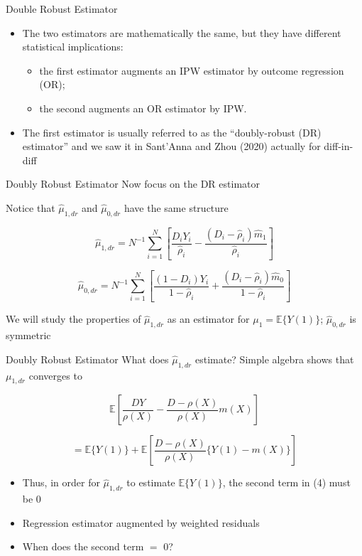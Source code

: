 \documentclass{beamer}
\begin{document}
\begin{frame}{Double Robust Estimator}

\begin{itemize}

\item     The two estimators are mathematically the same, but they have different statistical implications:
    	\begin{itemize}
	\item  the first estimator augments an IPW estimator by outcome regression (OR); 
	\item the second augments an OR estimator by IPW.
	\end{itemize}
\item The first estimator is usually referred to as the ``doubly-robust (DR) estimator'' and we saw it in Sant'Anna and Zhou (2020) actually for diff-in-diff

\end{itemize}
\end{frame}


\begin{frame}{Doubly Robust Estimator}
    Now focus on the DR estimator

    Notice that \( \hat{\mu}_{1,dr} \) and \( \hat{\mu}_{0,dr} \) have the same structure

    \[
    \hat{\mu}_{1,dr} = N^{-1} \sum_{i=1}^{N} \left[ \frac{D_iY_i}{\hat{\rho}_i} - \frac{(D_i - \hat{\rho}_i)\hat{m}_1}{\hat{\rho}_i} \right]
    \]

    \[
    \hat{\mu}_{0,dr} = N^{-1} \sum_{i=1}^{N} \left[ \frac{(1 - D_i)Y_i}{1 - \hat{\rho}_i} + \frac{(D_i - \hat{\rho}_i)\hat{m}_0}{1 - \hat{\rho}_i} \right]
    \]

    We will study the properties of \( \hat{\mu}_{1,dr} \) as an estimator for \( \mu_1 = \mathbb{E}\{Y(1)\} \); \( \hat{\mu}_{0,dr} \) is symmetric
\end{frame}




\begin{frame}{Doubly Robust Estimator}
    What does \( \hat{\mu}_{1,dr} \) estimate? Simple algebra shows that \( \mu_{1, dr} \) converges to

    \[
    \mathbb{E}\left[ \frac{DY}{\rho(X)} - \frac{D - \rho(X)}{\rho(X)}m(X) \right]
    \]

    \[
    = \mathbb{E}\{Y(1)\} + \mathbb{E}\left[ \frac{D - \rho(X)}{\rho(X)}\{Y(1) - m(X)\} \right]
    \]


\begin{itemize}
\item     Thus, in order for \( \hat{\mu}_{1,dr} \) to estimate \( \mathbb{E}\{Y(1)\} \), the second term in (4) must be 0

\item     Regression estimator augmented by weighted residuals

\item     When does the second term $=$ 0?

\end{itemize}
\end{frame}
\end{document}
